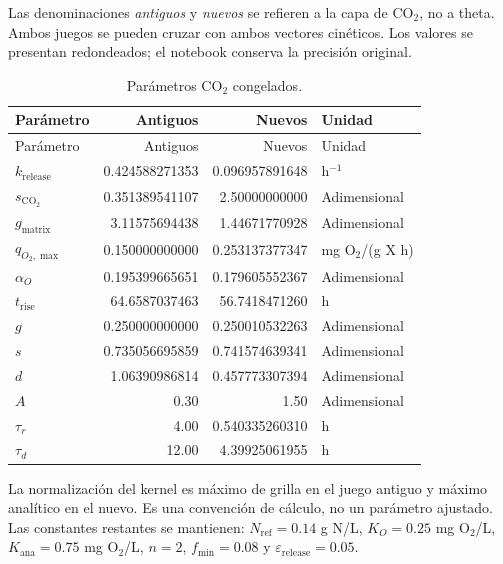 \documentclass[11pt,a4paper]{article}
\begin{document}
Las denominaciones \emph{antiguos} y \emph{nuevos} se refieren a la capa
de CO\(_2\), no a theta. Ambos juegos se pueden cruzar con ambos vectores
cinéticos. Los valores se presentan redondeados; el notebook conserva
la precisión original.

\begin{longtable}{@{}P{5.6cm}rrP{2.4cm}@{}}
\caption{Parámetros CO\(_2\) congelados.}\label{tab:co2params}\\
\toprule Parámetro & Antiguos & Nuevos & Unidad \\\midrule\endfirsthead
\toprule Parámetro & Antiguos & Nuevos & Unidad \\\midrule\endhead
\bottomrule\endfoot
$k_{\mathrm{release}}$ & 0.424588271353 & 0.096957891648 & h$^{-1}$\\
$s_{\mathrm{CO_2}}$ & 0.351389541107 & 2.50000000000 & Adimensional\\
$g_{\mathrm{matrix}}$ & 3.11575694438 & 1.44671770928 & Adimensional\\
$q_{O_2,\max}$ & 0.150000000000 & 0.253137377347 & mg O\(_2\)/(g X h)\\
$\alpha_O$ & 0.195399665651 & 0.179605552367 & Adimensional\\
$t_{\mathrm{rise}}$ & 64.6587037463 & 56.7418471260 & h\\
$g$ & 0.250000000000 & 0.250010532263 & Adimensional\\
$s$ & 0.735056695859 & 0.741574639341 & Adimensional\\
$d$ & 1.06390986814 & 0.457773307394 & Adimensional\\
$A$ & 0.30 & 1.50 & Adimensional\\
$\tau_r$ & 4.00 & 0.540335260310 & h\\
$\tau_d$ & 12.00 & 4.39925061955 & h\\
\end{longtable}

La normalización del kernel es máximo de grilla en el juego antiguo y máximo
analítico en el nuevo. Es una convención de cálculo, no un parámetro ajustado.
Las constantes restantes se mantienen: $N_{\mathrm{ref}}=0.14$ g N/L,
$K_O=0.25$ mg O\(_2\)/L, $K_{\mathrm{ana}}=0.75$ mg O\(_2\)/L,
$n=2$, $f_{\min}=0.08$ y $\varepsilon_{\mathrm{release}}=0.05$.
\end{document}
